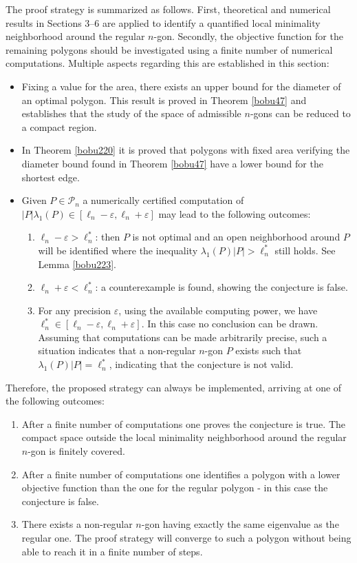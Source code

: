 \documentclass[11pt]{article}
\numberwithin{equation}{section}\newtheorem*{jepEnonce}{\jepEnonceTitle}\newenvironment{enonce*}[1]{\def\jepEnonceTitle{#1}\jepEnonce}{\endjepEnonce}\newtheorem*{conj*}{Conjecture}
\newenvironment{enumeratei}
{\bgroup\def\theenumi{\roman{enumi}}\def\theenumii{\arabic{enumii}}\begin{enumerate}}
{\end{enumerate}\egroup}
\newenvironment{enumeratea}
{\bgroup\def\theenumi{\alph{enumi}}\begin{enumerate}}
{\end{enumerate}\egroup}
\let\epsilon\varepsilon
\theoremstyle{plain}
\theoremstyle{definition}
\begin{document}
The proof strategy is summarized as follows. First, theoretical and numerical results in Sections 3--6 are applied to identify a quantified local minimality neighborhood around the regular $n$-gon. Secondly, the objective function for the remaining polygons should be investigated using a finite number of numerical computations. Multiple aspects regarding this are established in this section:
\begin{itemize}
\item Fixing a value for the area, there exists an upper bound for the diameter of an optimal polygon. This result is proved in Theorem \ref{bobu47} and establishes that the study of the space of admissible $n$-gons can be reduced to a compact region.
\item In Theorem \ref{bobu220} it is proved that polygons with fixed area verifying the diameter bound found in Theorem \ref{bobu47} have a lower bound for the shortest edge.
\item Given $P\in \mathcal P_n$ a numerically certified computation of $ |P|\lambda_1(P) \in [\ell_n-\epsilon,\ell_n+\epsilon]$ may lead to the following outcomes:
\begin{enumeratei}
\item
$\ell_n-\epsilon>\ell_n^*$: then $P$ is not optimal and an open neighborhood around $P$ will be identified where the inequality $\lambda_1(P)|P|>\ell_n^*$ still holds. See Lemma \ref{bobu223}.
\item
 $\ell_n+\epsilon<\ell_n^*$: a counterexample is found, showing the conjecture is false.
\item
For any precision $\epsilon$, using the available computing power, we have $\ell_n^* \in [\ell_n-\epsilon,\ell_n+\epsilon]$. In this case no conclusion can be drawn. Assuming that computations can be made arbitrarily precise, such a situation indicates that a non-regular $n$-gon $P$ exists such that $\lambda_1(P)|P|=\ell_n^*$, indicating that the conjecture is not valid.
\end{enumeratei}
\end{itemize}

Therefore, the proposed strategy can always be implemented, arriving at one of the following outcomes:

\begin{enumeratea}
\item
After a finite number of computations one proves the conjecture is true. The compact space outside the local minimality neighborhood around the regular $n$-gon is finitely covered.

\item
After a finite number of computations one identifies a polygon with a lower objective function than the one for the regular polygon - in this case the conjecture is false.

\item
There exists a non-regular $n$-gon having exactly the same eigenvalue as the regular one. The proof strategy will converge to such a polygon without being able to reach it in a finite number of steps.
\end{enumeratea}
\end{document}
